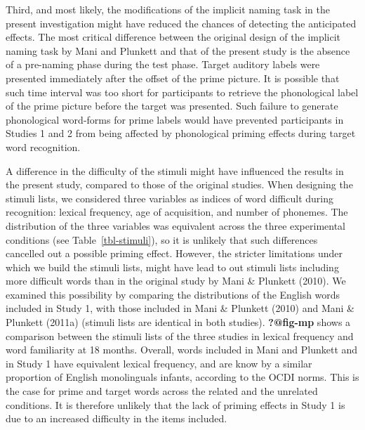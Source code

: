 \documentclass[
  12pt,
  b5paperpaper,
  twoside]{scrreprt}
\begin{document}
Third, and most likely, the modifications of the implicit naming task in
the present investigation might have reduced the chances of detecting
the anticipated effects. The most critical difference between the
original design of the implicit naming task by Mani and Plunkett and
that of the present study is the absence of a pre-naming phase during
the test phase. Target auditory labels were presented immediately after
the offset of the prime picture. It is possible that such time interval
was too short for participants to retrieve the phonological label of the
prime picture before the target was presented. Such failure to generate
phonological word-forms for prime labels would have prevented
participants in Studies 1 and 2 from being affected by phonological
priming effects during target word recognition.

A difference in the difficulty of the stimuli might have influenced the
results in the present study, compared to those of the original studies.
When designing the stimuli lists, we considered three variables as
indices of word difficult during recognition: lexical frequency, age of
acquisition, and number of phonemes. The distribution of the three
variables was equivalent across the three experimental conditions (see
Table~\ref{tbl-stimuli}), so it is unlikely that such differences
cancelled out a possible priming effect. However, the stricter
limitations under which we build the stimuli lists, might have lead to
out stimuli lists including more difficult words than in the original
study by Mani \& Plunkett (2010). We examined this possibility by
comparing the distributions of the English words included in Study 1,
with those included in Mani \& Plunkett (2010) and Mani \& Plunkett
(2011a) (stimuli lists are identical in both studies). \textbf{?@fig-mp}
shows a comparison between the stimuli lists of the three studies in
lexical frequency and word familiarity at 18 months. Overall, words
included in Mani and Plunkett and in Study 1 have equivalent lexical
frequency, and are know by a similar proportion of English monolinguals
infants, according to the OCDI norms. This is the case for prime and
target words across the related and the unrelated conditions. It is
therefore unlikely that the lack of priming effects in Study 1 is due to
an increased difficulty in the items included.
\end{document}
